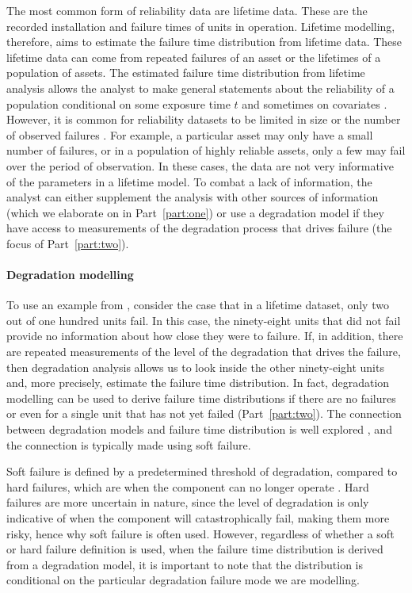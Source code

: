 The most common form of reliability data are lifetime data. These are the recorded installation and failure times of units in operation. Lifetime modelling, therefore, aims to estimate the failure time distribution from lifetime data. These lifetime data can come from repeated failures of an asset or the lifetimes of a population of assets. The estimated failure time distribution from lifetime analysis allows the analyst to make general statements about the reliability of a population conditional on some exposure time $t$ and sometimes on covariates \cite{moore2016}. However, it is common for reliability datasets to be limited in size or the number of observed failures \citep{Meeker2022}. For example, a particular asset may only have a small number of failures, or in a population of highly reliable assets, only a few may fail over the period of observation. In these cases, the data are not very informative of the parameters in a lifetime model. To combat a lack of information, the analyst can either supplement the analysis with other sources of information (which we elaborate on in Part~\ref{part:one}) or use a degradation model if they have access to measurements of the degradation process that drives failure (the focus of Part~\ref{part:two}).

\paragraph*{Degradation modelling} 

To use an example from \citet{Meeker2022}, consider the case that in a lifetime dataset, only two out of one hundred units fail. In this case, the ninety-eight units that did not fail provide no information about how close they were to failure. If, in addition, there are repeated measurements of the level of the degradation that drives the failure, then degradation analysis allows us to look inside the other ninety-eight units and, more precisely, estimate the failure time distribution. In fact, degradation modelling can be used to derive failure time distributions if there are no failures or even for a single unit that has not yet failed (Part~\ref{part:two}). The connection between degradation models and failure time distribution is well explored \citep{lu1996,bae2007,Meeker2022,lawless2004}, and the connection is typically made using soft failure.

Soft failure is defined by a predetermined threshold of degradation, compared to hard failures, which are when the component can no longer operate \citep{hamada2008}. Hard failures are more uncertain in nature, since the level of degradation is only indicative of when the component will catastrophically fail, making them more risky, hence why soft failure is often used. However, regardless of whether a soft or hard failure definition is used, when the failure time distribution is derived from a degradation model, it is important to note that the distribution is conditional on the particular degradation failure mode we are modelling.

